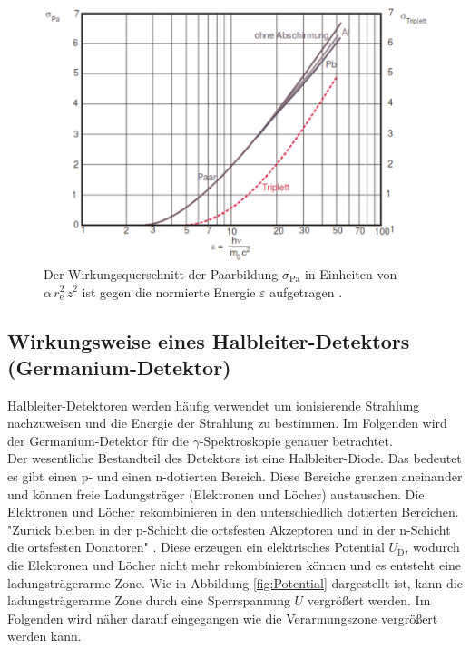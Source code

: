 \begin{figure}[H]
	\includegraphics[width=\linewidth]{Bilder/SigmaPa.png}
	\caption{Der Wirkungsquerschnitt der Paarbildung $\sigma_\text{Pa}$ in Einheiten von $\alpha\,r_\text{e}^2\,z^2$ ist gegen die normierte Energie $\varepsilon$ aufgetragen \cite{V18}.}
	\label{fig:SigmaPa}
\end{figure}



\newpage
\subsection{Wirkungsweise eines Halbleiter-Detektors (Germanium-Detektor)}
Halbleiter-Detektoren werden häufig verwendet um ionisierende Strahlung nachzuweisen und die Energie der Strahlung zu bestimmen. Im Folgenden wird der Germanium-Detektor für die $\gamma$-Spektroskopie genauer betrachtet. \\
Der wesentliche Bestandteil des Detektors ist eine Halbleiter-Diode. Das bedeutet es gibt einen p- und einen n-dotierten Bereich. Diese Bereiche grenzen aneinander und können freie Ladungsträger (Elektronen und Löcher) austauschen. Die Elektronen und Löcher rekombinieren in den unterschiedlich dotierten Bereichen. "Zurück bleiben in der p-Schicht die ortsfesten Akzeptoren und in der n-Schicht die ortsfesten Donatoren" \cite[10]{V18}. Diese erzeugen ein elektrisches Potential $U_\text{D}$, wodurch die Elektronen und Löcher nicht mehr rekombinieren können und es entsteht eine ladungsträgerarme Zone. Wie in Abbildung \eqref{fig:Potential} dargestellt ist, kann die ladungsträgerarme Zone durch eine Sperrspannung $U$ vergrößert werden. Im Folgenden wird näher darauf eingegangen wie die Verarmungszone vergrößert werden kann.

